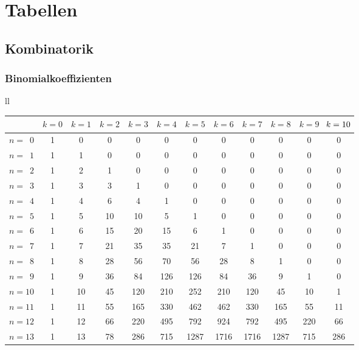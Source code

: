 
\onecolumn
\chapter{Tabellen}
\section{Kombinatorik}
\subsection{Binomialkoeffizienten}

\hspace{-6pt}\begin{tabular}{ll}
\begin{tabular}[t]{l|ccccccccccc}
\toprule
& $k=0$ & $k=1$ & $k=2$ & $k=3$ & $k=4$ & $k=5$ & $k=6$ & $k=7$ & $k=8$ & $k=9$ & $\hspace{-2pt}k=10\hspace{-2pt}$\\
\midrule%
$n=\phantom{1}0$ & 1 & 0 & 0 & 0 & 0 & 0 & 0 & 0 & 0 & 0 & 0\\
$n=\phantom{1}1$ & 1 & 1 & 0 & 0 & 0 & 0 & 0 & 0 & 0 & 0 & 0\\
$n=\phantom{1}2$ & 1 & 2 & 1 & 0 & 0 & 0 & 0 & 0 & 0 & 0 & 0\\
$n=\phantom{1}3$ & 1 & 3 & 3 & 1 & 0 & 0 & 0 & 0 & 0 & 0 & 0\\
\midrule%
$n=\phantom{1}4$ & 1 & 4 & 6 & 4 & 1 & 0 & 0 & 0 & 0 & 0 & 0\\
$n=\phantom{1}5$ & 1 & 5 & 10 & 10 & 5 & 1 & 0 & 0 & 0 & 0 & 0\\
$n=\phantom{1}6$ & 1 & 6 & 15 & 20 & 15 & 6 & 1 & 0 & 0 & 0 & 0\\
$n=\phantom{1}7$ & 1 & 7 & 21 & 35 & 35 & 21 & 7 & 1 & 0 & 0 & 0\\
\midrule%
$n=\phantom{1}8$ & 1 & 8 & 28 & 56 & 70 & 56 & 28 & 8 & 1 & 0 & 0\\
$n=\phantom{1}9$ & 1 & 9 & 36 & 84 & 126 & 126 & 84 & 36 & 9 & 1 & 0\\
$n=10$ & 1 & 10 & 45 & 120 & 210 & 252 & 210 & 120 & 45 & 10 & 1\\
$n=11$ & 1 & 11 & 55 & 165 & 330 & 462 & 462 & 330 & 165 & 55 & 11\\
\midrule%
$n=12$ & 1 & 12 & 66 & 220 & 495 & 792 & 924 & 792 & 495 & 220 & 66\\
$n=13$ & 1 & 13 & 78 & 286 & 715 & 1287 & 1716 & 1716 & 1287 & 715 & 286\\

\end{tabular}
\end{tabular}
